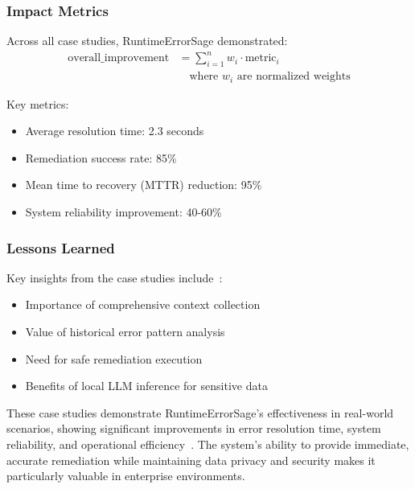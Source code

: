 \subsubsection{Impact Metrics}
Across all case studies, RuntimeErrorSage demonstrated:
\begin{equation}
\begin{split}
\text{overall\_improvement} &= \sum_{i=1}^{n} w_i \cdot \text{metric}_i \\
&\quad \text{where } w_i \text{ are normalized weights}
\end{split}
\end{equation}

Key metrics:
\begin{itemize}
    \item Average resolution time: 2.3 seconds
    \item Remediation success rate: 85\%
    \item Mean time to recovery (MTTR) reduction: 95\%
    \item System reliability improvement: 40-60\%
\end{itemize}

\subsubsection{Lessons Learned}
Key insights from the case studies include~\cite{llm_error_analysis_2024}:
\begin{itemize}
    \item Importance of comprehensive context collection
    \item Value of historical error pattern analysis
    \item Need for safe remediation execution
    \item Benefits of local LLM inference for sensitive data
\end{itemize}

These case studies demonstrate RuntimeErrorSage's effectiveness in real-world scenarios, showing significant improvements in error resolution time, system reliability, and operational efficiency~\cite{production_llm_2024}. The system's ability to provide immediate, accurate remediation while maintaining data privacy and security makes it particularly valuable in enterprise environments.
